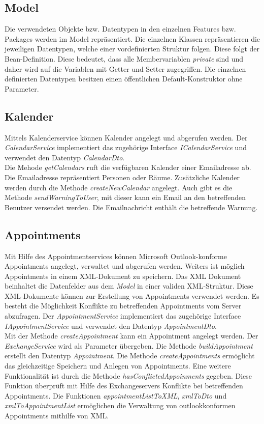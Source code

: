 \subsection{Model}
Die verwendeten Objekte bzw. Datentypen in den einzelnen Features bzw. Packages werden im Model repräsentiert. Die einzelnen Klassen repräsentieren die jeweiligen Datentypen, welche einer vordefinierten Struktur folgen. Diese folgt der Bean-Definition. Diese bedeutet, dass alle Membervariablen \textit{private} sind und daher wird auf die Variablen mit Getter und Setter zugegriffen. Die einzelnen definierten Datentypen besitzen einen öffentlichen Default-Konstruktor ohne Parameter.
\subsection{Kalender}
Mittels Kalenderservice können Kalender angelegt und abgerufen werden. Der \textit{CalendarService} implementiert das zugehörige Interface \textit{ICalendarService} und verwendet den Datentyp \textit{CalendarDto}.\\ Die Mehode \textit{getCalendars} ruft die verfügbaren Kalender einer Emailadresse ab. Die Emailadresse repräsentiert Personen oder Räume. Zusätzliche Kalender werden durch die Methode \textit{createNewCalendar} angelegt. Auch gibt es die Methode \textit{sendWarningToUser}, mit dieser kann ein Email an den betreffenden Benutzer versendet werden. Die Emailnachricht enthält die betreffende Warnung.
\subsection{Appointments}
Mit Hilfe des Appointmentservices können Microsoft Outlook-konforme Appointments angelegt, verwaltet und abgerufen werden. Weiters ist möglich Appointments in einem XML-Dokument zu speichern. Das XML Dokument beinhaltet die Datenfelder aus dem \textit{Model} in einer validen XML-Struktur. Diese XML-Dokumente können zur Erstellung von Appointments verwendet werden. Es besteht die Möglichkeit Konflikte zu betreffenden Appointments vom Server abzufragen. Der \textit{AppointmentService} implementiert das zugehörige Interface \textit{IAppointmentService} und verwendet den Datentyp \textit{AppointmentDto}. \\ Mit der Methode \textit{createAppointment} kann ein Appointment angelegt werden. Der \textit{ExchangeService} wird als Parameter übergeben. Die Methode \textit{buildAppointment} erstellt den Datentyp \textit{Appointment}. Die Methode \textit{createAppointments} ermöglicht das gleichzeitige Speichern und Anlegen von Appointments. Eine weitere Funktionalität ist durch die Methode \textit{hasConflictedAppoinments} gegeben. Diese Funktion überprüft mit Hilfe des Exchangeservers Konflikte bei betreffenden Appointments. Die Funktionen \textit{appointmentListToXML}, \textit{xmlToDto} und \textit{xmlToAppointmentList} ermöglichen die Verwaltung von outlookkonformen Appointments mithilfe von XML.
